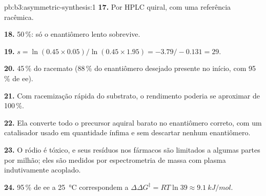 \begin{solution}{pb:b3:asymmetric-synthesis:1}
\textbf{17.} Por HPLC quiral, com uma referência racêmica.

\textbf{18.} 50\,\%: só o enantiômero lento sobrevive.

\textbf{19.} $s = \ln(0.45 \times 0.05)/\ln(0.45 \times 1.95) = -3.79/-0.131 = 29$.

\textbf{20.} 45\,\% do racemato (88\,\% do enantiômero desejado presente no início,
com 95\,\% de ee).

\textbf{21.} Com racemização rápida do substrato, o rendimento poderia se aproximar de 100\,\%.

\textbf{22.} Ela converte todo o precursor aquiral barato no enantiômero correto,
com um catalisador usado em quantidade ínfima e sem descartar nenhum enantiômero.

\textbf{23.} O ródio é tóxico, e seus resíduos nos fármacos são limitados a algumas partes por
milhão; eles são medidos por espectrometria de massa com plasma indutivamente acoplado.

\textbf{24.} 95\,\% de ee a \qty{25}{\celsius} correspondem a $\Delta\Delta G^\ddagger = RT\ln 39 \approx \qty{9.1}{kJ/mol}$.
\end{solution}
